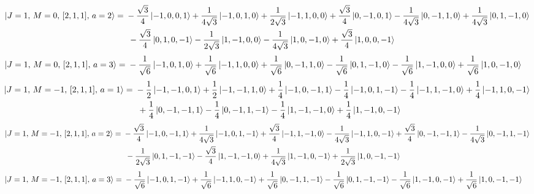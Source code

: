 \documentclass{article}
\begin{document}
{\small
\begin{equation*}
\begin{aligned}
\ket{J=1,\,M=0,\,[2,1,1],\,a=2} = \; &- \frac{\sqrt{3}}{4} \ket{-1,0,0,1} + \frac{1}{4\sqrt{3}} \ket{-1,0,1,0} + \frac{1}{2\sqrt{3}} \ket{-1,1,0,0} + \frac{\sqrt{3}}{4} \ket{0,-1,0,1} - \frac{1}{4\sqrt{3}} \ket{0,-1,1,0} + \frac{1}{4\sqrt{3}} \ket{0,1,-1,0} \\
  & \; - \frac{\sqrt{3}}{4} \ket{0,1,0,-1} - \frac{1}{2\sqrt{3}} \ket{1,-1,0,0} - \frac{1}{4\sqrt{3}} \ket{1,0,-1,0} + \frac{\sqrt{3}}{4} \ket{1,0,0,-1}
\end{aligned}
\end{equation*}}
\begin{equation*}
\begin{aligned}
\ket{J=1,\,M=0,\,[2,1,1],\,a=3} = \; &- \frac{1}{\sqrt{6}} \ket{-1,0,1,0} + \frac{1}{\sqrt{6}} \ket{-1,1,0,0} + \frac{1}{\sqrt{6}} \ket{0,-1,1,0} - \frac{1}{\sqrt{6}} \ket{0,1,-1,0} - \frac{1}{\sqrt{6}} \ket{1,-1,0,0} + \frac{1}{\sqrt{6}} \ket{1,0,-1,0}
\end{aligned}
\end{equation*}
{\small
\begin{equation*}
\begin{aligned}
\ket{J=1,\,M=-1,\,[2,1,1],\,a=1} = \; &- \frac{1}{2} \ket{-1,-1,0,1} + \frac{1}{2} \ket{-1,-1,1,0} + \frac{1}{4} \ket{-1,0,-1,1} - \frac{1}{4} \ket{-1,0,1,-1} - \frac{1}{4} \ket{-1,1,-1,0} + \frac{1}{4} \ket{-1,1,0,-1} \\
  & \; + \frac{1}{4} \ket{0,-1,-1,1} - \frac{1}{4} \ket{0,-1,1,-1} - \frac{1}{4} \ket{1,-1,-1,0} + \frac{1}{4} \ket{1,-1,0,-1}
\end{aligned}
\end{equation*}}
{\small
\begin{equation*}
\begin{aligned}
\ket{J=1,\,M=-1,\,[2,1,1],\,a=2} = \; &- \frac{\sqrt{3}}{4} \ket{-1,0,-1,1} + \frac{1}{4\sqrt{3}} \ket{-1,0,1,-1} + \frac{\sqrt{3}}{4} \ket{-1,1,-1,0} - \frac{1}{4\sqrt{3}} \ket{-1,1,0,-1} + \frac{\sqrt{3}}{4} \ket{0,-1,-1,1} - \frac{1}{4\sqrt{3}} \ket{0,-1,1,-1} \\
  & \; - \frac{1}{2\sqrt{3}} \ket{0,1,-1,-1} - \frac{\sqrt{3}}{4} \ket{1,-1,-1,0} + \frac{1}{4\sqrt{3}} \ket{1,-1,0,-1} + \frac{1}{2\sqrt{3}} \ket{1,0,-1,-1}
\end{aligned}
\end{equation*}}
\begin{equation*}
\begin{aligned}
\ket{J=1,\,M=-1,\,[2,1,1],\,a=3} = \; &- \frac{1}{\sqrt{6}} \ket{-1,0,1,-1} + \frac{1}{\sqrt{6}} \ket{-1,1,0,-1} + \frac{1}{\sqrt{6}} \ket{0,-1,1,-1} - \frac{1}{\sqrt{6}} \ket{0,1,-1,-1} - \frac{1}{\sqrt{6}} \ket{1,-1,0,-1} + \frac{1}{\sqrt{6}} \ket{1,0,-1,-1}
\end{aligned}
\end{equation*}
\end{document}
